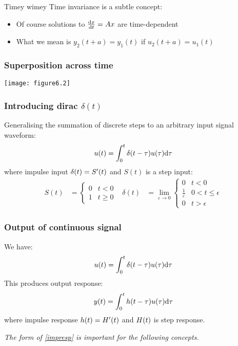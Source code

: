 \documentclass{beamer-control}
\begin{document}

\begin{frame}{Timey wimey}
Time invariance is a subtle concept:
\begin{itemize}
\item Of course solutions to $\frac{\mathrm{d} x}{\mathrm{d} t} = Ax$ are time-dependent
\item What we mean is $y_2(t+a) = y_1 (t)$ if $u_2(t+a) = u_1 (t)$
\end{itemize}
\end{frame}

\begin{frame}
\frametitle{Superposition across time}

\texttt{[image: figure6.2]}


\end{frame}

\begin{frame}
\frametitle{Introducing dirac $\delta(t)$}

Generalising the summation of discrete steps to an arbitrary input signal waveform:
\begin{align}\label{eq:imp}
u(t) = \int^t_0 \delta(t-\tau)u(\tau)\mathrm{d}\tau
\end{align}
where impulse input $\delta(t)=S'(t)$ and $S(t)$ is a step input:
\begin{align}
S(t) &=
\begin{cases}
0 & t<0 \\
1 & t\ge 0
\end{cases}
&
\delta(t) &= 
\lim_{\varepsilon\to0}
\begin{cases}
0 & t<0 \\
\tfrac{1}{\varepsilon} & 0<t\le\epsilon \\
0 & t>\epsilon
\end{cases}
\end{align}

\end{frame}

\begin{frame}
\frametitle{Output of continuous signal}
We have:
\begin{align}\label{eq:imp}
u(t) = \int^t_0 \delta(t-\tau)u(\tau)\mathrm{d}\tau
\end{align}
This produces output response:
\begin{align}\label{eq:impresp}
y(t) = \int^t_0 h(t-\tau)u(\tau)\mathrm{d}\tau
\end{align}
where impulse response $h(t)=H'(t)$ and $H(t)$ is step response.

\alert{\em The form of \eqref{impresp} is important for the following concepts.}

\end{frame}
\end{document}
